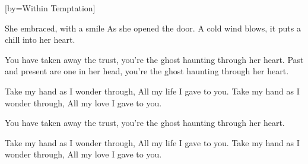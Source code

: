  

[by=Within Temptation]




\beginverse
She embraced, with a smile
As she opened the door.
A cold wind blows, it puts a chill into her heart.
\endverse

\beginverse
You have taken away the trust,
you're the ghost haunting through her heart.
Past and present are one in her head,
you're the ghost haunting through her heart.
\endverse

\beginverse
Take my hand as I wonder through,
All my life I gave to you.
Take my hand as I wonder through,
All my love I gave to you.
\endverse

\beginverse
You have taken away the trust,
you're the ghost haunting through her heart.
\endverse

\beginverse
Take my hand as I wonder through,
All my life I gave to you.
Take my hand as I wonder through,
All my love I gave to you. 
\endverse


\endsong

